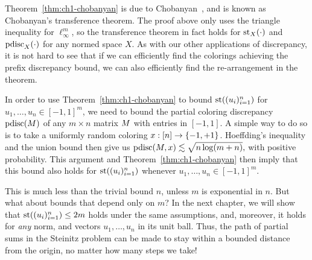 
Theorem~\ref{thm:ch1-chobanyan} is due to Chobanyan~\cite{Chobanyan94},
and is known as Chobanyan's transference theorem. The proof above only uses the triangle inequality for $\ell_\infty^m$, so the transference theorem in fact holds for $\operatorname{st}_X(\cdot)$ and $\operatorname{pdisc}_X(\cdot)$ for any normed space $X$. As with our other applications of discrepancy, it is not hard to see that if we can efficiently find the colorings achieving the prefix discrepancy bound, we can also efficiently find the re-arrangement in the theorem. 

In order to use Theorem~\ref{thm:ch1-chobanyan} to bound $\operatorname{st}((u_i)_{i=1}^n)$ for $u_1, \ldots, u_n \in [-1,1]^m$, we need to bound the partial coloring discrepancy $\operatorname{pdisc}(M)$ of any $m\times n$ matrix $M$ with entries in $[-1,1]$. A simple way to do so is to take a uniformly random coloring $x:[n]\to \{-1,+1\}$.
Hoeffding's inequality and the union bound then give us 
\( \operatorname{pdisc}(M, x) \lesssim \sqrt{n
  \log(m+n)}, \) with positive probability. This argument and Theorem~\ref{thm:ch1-chobanyan} then imply that this bound also holds for $\operatorname{st}((u_i)_{i=1}^n)$ whenever $u_1, \ldots, u_n \in [-1,1]^m$.
  
This is much less than the trivial bound $n$, unless $m$ is
exponential in $n$. But what about bounds that depend only on $m$? 
In
the next chapter, we will show that $\operatorname{st}((u_i)_{i=1}^n) \le 2m$ holds under the same assumptions, and, moreover, it holds for \emph{any} norm, and vectors $u_1, \ldots, u_n$ in its unit ball. Thus, the path of partial sums in the Steinitz
problem can be made to stay within a bounded distance from the origin, no matter how many steps we take! %

